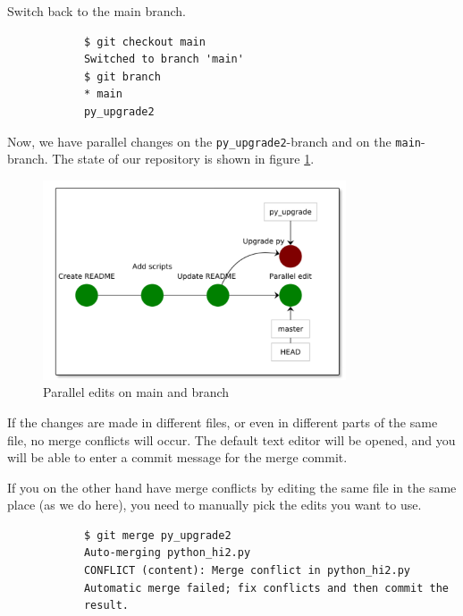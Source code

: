 \documentclass[../main/git_course_main.tex]{subfiles}
\begin{document}
	Switch back to the main branch.
	
	\begin{codebox}
		\begin{lstlisting}
			$ git checkout main
			Switched to branch 'main'
			$ git branch
			* main
			py_upgrade2
		\end{lstlisting}
	\end{codebox}
	
	Now, we have parallel changes on the \verb$py_upgrade2$-branch and on the \verb$main$-branch. The state of our repository is shown in figure \ref{fig:before_conflict_merge}.
	
	\begin{figure}[h!]
		\centering
		\includegraphics[width=0.8\textwidth]{../visualizations/chapter4/45_parallel_edits_on_master_branch}
		\caption{Parallel edits on main and branch}
		\label{fig:before_conflict_merge}
	\end{figure}
	
	If the changes are made in different files, or even in different parts of the same
	file, no merge conflicts will occur. The default text editor will be opened,
	and you will be able to enter a commit message for the merge commit.
	
	If you on the other hand have merge conflicts by editing the same file in the same place (as we do here), you need to manually pick the edits you want to use.
	
	\begin{codebox}
		\begin{lstlisting}
			$ git merge py_upgrade2
			Auto-merging python_hi2.py
			CONFLICT (content): Merge conflict in python_hi2.py
			Automatic merge failed; fix conflicts and then commit the 
			result.
		\end{lstlisting}
	\end{codebox}
	
\end{document}
